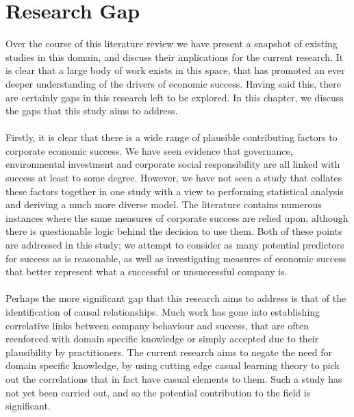 {\section{Research Gap}
{Over the course of this literature review we have present a snapshot of existing studies in this domain, and discuss their implications for the current research. It is clear that a large body of work exists in this space, that has promoted an ever deeper understanding of the drivers of economic success. Having said this, there are certainly gaps in this research left to be explored. In this chapter, we discuss the gaps that this study aims to address. \\\\
Firstly, it is clear that there is a wide range of plausible contributing factors to corporate economic success. We have seen evidence that governance, environmental investment and corporate social responsibility are all linked with success at least to some degree. However, we have not seen a study that collates these factors together in one study with a view to performing statistical analysis and deriving a much more diverse model. The literature contains numerous instances where the same measures of corporate success are relied upon, although there is questionable logic behind the decision to use them. Both of these points are addressed in this study; we attempt to consider as many potential predictors for success as is reasonable, as well as investigating measures of economic success that better represent what a successful or unsuccessful company is.\\\\
Perhaps the more significant gap that this research aims to address is that of the identification of causal relationships. Much work has gone into establishing correlative links between company behaviour and success, that are often reenforced with domain specific knowledge or simply accepted due to their plausibility by practitioners. The current research aims to negate the need for domain specific knowledge, by using cutting edge casual learning theory to pick out the correlations that in fact have casual elements to them. Such a study has not yet been carried out, and so the potential contribution to the field is significant.}


}